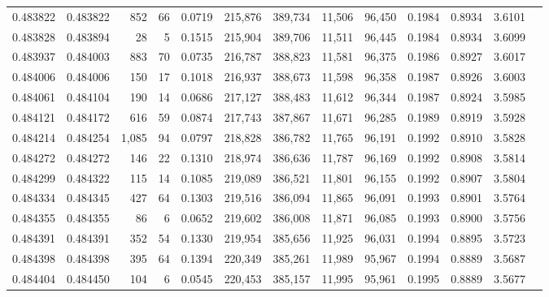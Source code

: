\begin{tabular}{rrrrrrrrrrrrr}
0.483822 & 0.483822 &   852 &    66 &                                     0.0719 & 215,876 & 389,734 &  11,506 &  96,450 & 0.1984 & 0.8934 & 3.6101 \\
0.483828 & 0.483894 &    28 &     5 &                                     0.1515 & 215,904 & 389,706 &  11,511 &  96,445 & 0.1984 & 0.8934 & 3.6099 \\
0.483937 & 0.484003 &   883 &    70 &                                     0.0735 & 216,787 & 388,823 &  11,581 &  96,375 & 0.1986 & 0.8927 & 3.6017 \\
0.484006 & 0.484006 &   150 &    17 &                                     0.1018 & 216,937 & 388,673 &  11,598 &  96,358 & 0.1987 & 0.8926 & 3.6003 \\
0.484061 & 0.484104 &   190 &    14 &                                     0.0686 & 217,127 & 388,483 &  11,612 &  96,344 & 0.1987 & 0.8924 & 3.5985 \\
0.484121 & 0.484172 &   616 &    59 &                                     0.0874 & 217,743 & 387,867 &  11,671 &  96,285 & 0.1989 & 0.8919 & 3.5928 \\
0.484214 & 0.484254 & 1,085 &    94 &                                     0.0797 & 218,828 & 386,782 &  11,765 &  96,191 & 0.1992 & 0.8910 & 3.5828 \\
0.484272 & 0.484272 &   146 &    22 &                                     0.1310 & 218,974 & 386,636 &  11,787 &  96,169 & 0.1992 & 0.8908 & 3.5814 \\
0.484299 & 0.484322 &   115 &    14 &                                     0.1085 & 219,089 & 386,521 &  11,801 &  96,155 & 0.1992 & 0.8907 & 3.5804 \\
0.484334 & 0.484345 &   427 &    64 &                                     0.1303 & 219,516 & 386,094 &  11,865 &  96,091 & 0.1993 & 0.8901 & 3.5764 \\
0.484355 & 0.484355 &    86 &     6 &                                     0.0652 & 219,602 & 386,008 &  11,871 &  96,085 & 0.1993 & 0.8900 & 3.5756 \\
0.484391 & 0.484391 &   352 &    54 &                                     0.1330 & 219,954 & 385,656 &  11,925 &  96,031 & 0.1994 & 0.8895 & 3.5723 \\
0.484398 & 0.484398 &   395 &    64 &                                     0.1394 & 220,349 & 385,261 &  11,989 &  95,967 & 0.1994 & 0.8889 & 3.5687 \\
0.484404 & 0.484450 &   104 &     6 &                                     0.0545 & 220,453 & 385,157 &  11,995 &  95,961 & 0.1995 & 0.8889 & 3.5677 \\

\end{tabular}

